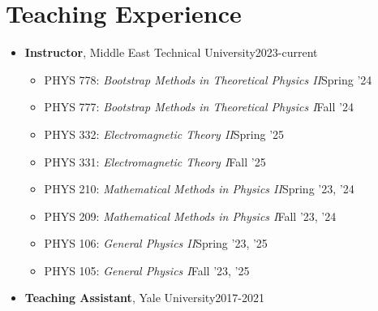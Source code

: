 \documentclass[a4paper,11pt]{article}
\begin{document}
 \section{\textcolor{burntorange}{Teaching Experience}}
\begin{itemize}[noitemsep,nolistsep] 
	\item[] \textbf{Instructor}, Middle East Technical University\hfill 2023-current
\vspace*{-.3em}
\begin{itemize}
	\item[] PHYS 778: \emph{Bootstrap Methods in Theoretical Physics II}\hfill Spring '24\hspace*{2.2em}\vspace*{-.3em}
	\item[] PHYS 777: \emph{Bootstrap Methods in Theoretical Physics I}\hfill Fall '24\hspace*{2.2em}\vspace*{-.3em}
	\item[] PHYS 332: \emph{Electromagnetic Theory II}\hfill Spring '25\hspace*{2.2em}\vspace*{-.3em}
	\item[] PHYS 331: \emph{Electromagnetic Theory I}\hfill Fall '25\hspace*{2.2em}\vspace*{-.3em}
	\item[] PHYS 210: \emph{Mathematical Methods in Physics II}\hfill Spring '23, '24\hspace*{2.2em}\vspace*{-.3em}
	\item[] PHYS 209: \emph{Mathematical Methods in Physics I}\hfill Fall '23, '24\hspace*{2.2em}\vspace*{-.3em}
	\item[] PHYS 106: \emph{General Physics II}\hfill Spring '23, '25\hspace*{2.2em}\vspace*{-.3em}
	\item[] PHYS 105: \emph{General Physics I}\hfill Fall '23, '25\hspace*{2.2em}\vspace*{-.3em}
\end{itemize} 
	\item[] \textbf{Teaching Assistant}, Yale University\hfill 2017-2021
	\vspace*{-.3em}
	\begin{itemize}

\end{itemize}
\end{itemize}
\end{document}
